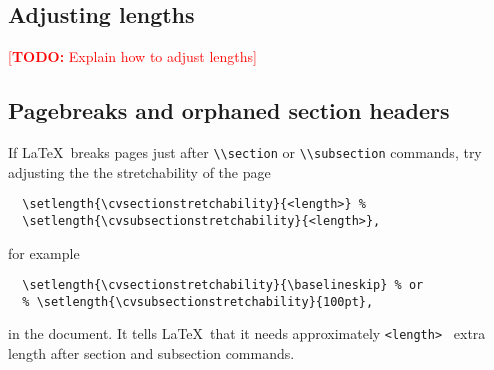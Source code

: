 \documentclass[a4paper,11pt]{article}
\newcommand{\todox}[1]{\textcolor{red}{[\textbf{TODO:} #1]}}
\newcommand{\code}[1]{\lstinline!#1!}
\newcommand{\Code}[1]{\lstinline!#1!~} %
\newcommand{\latex}{\LaTeX}
\begin{document}
\subsection*{Adjusting lengths}
\todox{Explain how to adjust lengths}
% 
% 
% 

\subsection{Pagebreaks and orphaned section headers}
If \latex\ breaks pages just after \code{\\section} or \code{\\subsection} commands, try adjusting
the the stretchability of the page
\begin{lstlisting}
  \setlength{\cvsectionstretchability}{<length>} %
  \setlength{\cvsubsectionstretchability}{<length>},
\end{lstlisting}
for example
\begin{lstlisting}
  \setlength{\cvsectionstretchability}{\baselineskip} % or
  % \setlength{\cvsubsectionstretchability}{100pt},
\end{lstlisting}
in the document. It tells \latex\ that it needs approximately \Code{<length>} extra length after 
section and subsection commands. 
\end{document}
